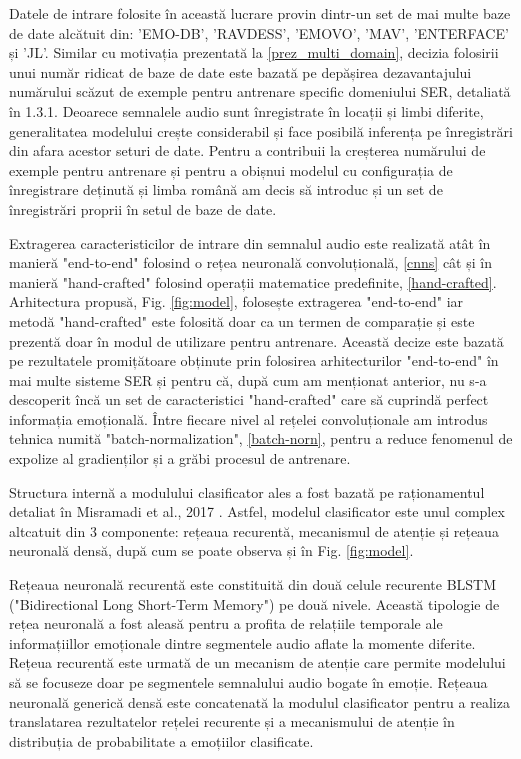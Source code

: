 \documentclass[a4paper,12pt]{book}
\begin{document}
					Datele de intrare folosite în această lucrare provin dintr-un set de mai multe baze de date alcătuit din: 'EMO-DB', 'RAVDESS', 'EMOVO', 'MAV', 'ENTERFACE' și 'JL'. Similar cu motivația prezentată la \ref{prez_multi_domain}, decizia folosirii unui număr ridicat de baze de date este bazată pe depășirea dezavantajului numărului scăzut de exemple pentru antrenare specific domeniului SER, detaliată în 1.3.1. Deoarece semnalele audio sunt înregistrate în locații și limbi diferite, generalitatea modelului crește considerabil și face posibilă inferența pe înregistrări din afara acestor seturi de date.  Pentru a contribuii la creșterea numărului de exemple pentru antrenare și pentru a obișnui modelul cu configurația de înregistrare deținută și limba română am decis să introduc și un set de înregistrări proprii în setul de baze de date. \par
					
					Extragerea caracteristicilor de intrare din semnalul audio este realizată atât în manieră "end-to-end" folosind o rețea neuronală convoluțională, \ref{cnns} cât și în manieră "hand-crafted" folosind operații matematice predefinite, \ref{hand-crafted}. Arhitectura propusă, Fig. \ref{fig:model}, folosește extragerea "end-to-end" iar metodă "hand-crafted" este folosită doar ca un termen de comparație și este prezentă doar în modul de utilizare pentru antrenare. Această decize este bazată pe rezultatele promițătoare obținute prin folosirea arhitecturilor "end-to-end"  în mai multe sisteme SER și pentru că, după cum am menționat anterior, nu s-a descoperit încă un set de caracteristici "hand-crafted" care să cuprindă perfect informația emoțională. Între fiecare nivel al rețelei convoluționale am introdus tehnica numită "batch-normalization", \ref{batch-norn}, pentru a reduce fenomenul de expolize al gradienților și a grăbi procesul de antrenare. \par
					Structura internă a modulului clasificator ales a fost bazată pe raționamentul detaliat în Misramadi et al., 2017 \cite{misramadi}. Astfel, modelul clasificator este unul complex altcatuit din 3 componente: rețeaua recurentă, mecanismul de atenție și rețeaua neuronală densă, după cum se poate observa și în Fig. \ref{fig:model}.   \par
					Rețeaua neuronală recurentă este constituită din două celule recurente BLSTM ("Bidirectional Long Short-Term Memory") pe două nivele. Această tipologie de rețea neuronală a fost aleasă pentru a profita de relațiile temporale ale informațiillor emoționale dintre segmentele audio aflate la momente diferite. Rețeua recurentă este urmată de un mecanism de atenție care permite modelului să se focuseze doar pe segmentele semnalului audio bogate în emoție. Rețeaua neuronală generică densă este concatenată la modulul clasificator pentru a realiza translatarea rezultatelor rețelei recurente și a mecanismului de atenție în distribuția de probabilitate a emoțiilor clasificate.\par
					
\end{document}
